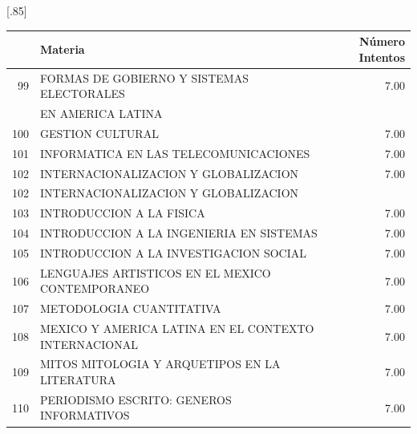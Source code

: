 \documentclass[12pt]{article}
\begin{document}
\begin{table}[ht]
\centering
\scalebox{0.75}[.85]{
\begin{tabular}{rlr}
  \hline
 & Materia & N\'umero Intentos\\ 
  \hline
  99 & FORMAS DE GOBIERNO Y SISTEMAS ELECTORALES & 7.00 \\ 
 & EN AMERICA LATINA &  \\ 
  100 & GESTION CULTURAL & 7.00 \\ 
    101 & INFORMATICA EN LAS TELECOMUNICACIONES & 7.00 \\ 
  102 & INTERNACIONALIZACION Y GLOBALIZACION & 7.00 \\ 
  102 & INTERNACIONALIZACION Y GLOBALIZACION & \\ 
  103 & INTRODUCCION A LA FISICA & 7.00 \\ 
  104 & INTRODUCCION A LA INGENIERIA EN SISTEMAS & 7.00 \\ 
  105 & INTRODUCCION A LA INVESTIGACION SOCIAL & 7.00 \\ 
  106 & LENGUAJES ARTISTICOS EN EL MEXICO CONTEMPORANEO & 7.00 \\ 
  107 & METODOLOGIA CUANTITATIVA & 7.00 \\ 
  108 & MEXICO Y AMERICA LATINA EN EL CONTEXTO INTERNACIONAL & 7.00 \\ 
  109 & MITOS MITOLOGIA Y ARQUETIPOS EN LA LITERATURA & 7.00 \\ 
  110 & PERIODISMO ESCRITO: GENEROS INFORMATIVOS & 7.00 \\ 


\end{tabular}}
\end{table}
\end{document}
